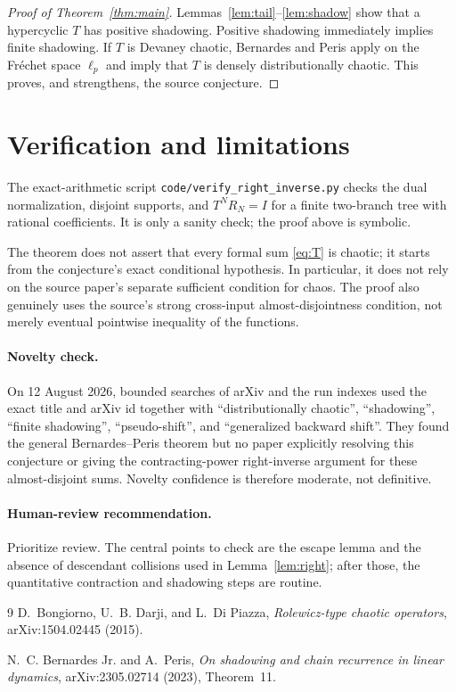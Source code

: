 \documentclass[11pt]{article}
\begin{document}
\begin{proof}[Proof of Theorem~\ref{thm:main}]
Lemmas~\ref{lem:tail}--\ref{lem:shadow} show that a hypercyclic $T$ has
positive shadowing.  Positive shadowing immediately implies finite
shadowing.  If $T$ is Devaney chaotic, Bernardes and Peris
\cite[Theorem~11]{BP} apply on the Fréchet space $\ell_p$ and imply that $T$
is densely distributionally chaotic.  This proves, and strengthens, the
source conjecture.
\end{proof}

\section{Verification and limitations}
The exact-arithmetic script \texttt{code/verify\_right\_inverse.py} checks the
dual normalization, disjoint supports, and $T^NR_N=I$ for a finite two-branch
tree with rational coefficients.  It is only a sanity check; the proof above
is symbolic.

The theorem does not assert that every formal sum \eqref{eq:T} is chaotic; it
starts from the conjecture's exact conditional hypothesis.  In particular,
it does not rely on the source paper's separate sufficient condition for
chaos.  The proof also genuinely uses the source's strong cross-input
almost-disjointness condition, not merely eventual pointwise inequality of
the functions.

\paragraph{Novelty check.}
On 12 August 2026, bounded searches of arXiv and the run indexes used the
exact title and arXiv id together with ``distributionally chaotic'',
``shadowing'', ``finite shadowing'', ``pseudo-shift'', and ``generalized
backward shift''.  They found the general Bernardes--Peris theorem but no
paper explicitly resolving this conjecture or giving the contracting-power
right-inverse argument for these almost-disjoint sums.  Novelty confidence is
therefore moderate, not definitive.

\paragraph{Human-review recommendation.}
Prioritize review.  The central points to check are the escape lemma and the
absence of descendant collisions used in Lemma~\ref{lem:right}; after those,
the quantitative contraction and shadowing steps are routine.

\begin{thebibliography}{9}
D.~Bongiorno, U.~B. Darji, and L.~Di Piazza,
\emph{Rolewicz-type chaotic operators}, arXiv:1504.02445 (2015).

N.~C. Bernardes Jr. and A.~Peris,
\emph{On shadowing and chain recurrence in linear dynamics},
arXiv:2305.02714 (2023), Theorem~11.
\end{thebibliography}
\end{document}
